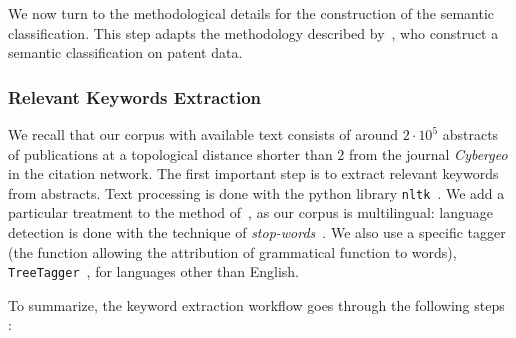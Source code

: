 \documentclass[10pt]{article}
\begin{document}
We now turn to the methodological details for the construction of the semantic classification. This step adapts the methodology described by~\cite{bergeaud2017classifying}, who construct a semantic classification on patent data.

\subsubsection*{Relevant Keywords Extraction}

We recall that our corpus with available text consists of around $2\cdot 10^5$ abstracts of publications at a topological distance shorter than 2 from the journal \textit{Cybergeo} in the citation network. The first important step is to extract relevant keywords from abstracts. Text processing is done with the python library \texttt{nltk}~\citep{bird2006nltk}. We add a particular treatment to the method of~\cite{bergeaud2017classifying}, as our corpus is multilingual: language detection is done with the technique of \emph{stop-words}~\citep{baldwin2010language}. We also use a specific tagger (the function allowing the attribution of grammatical function to words), \texttt{TreeTagger}~\citep{schmid1994probabilistic}, for languages other than English.


To summarize, the keyword extraction workflow goes through the following steps :
\end{document}

